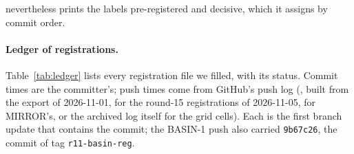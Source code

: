 nevertheless prints the labels pre-registered and decisive, which it assigns by commit order.

\paragraph{Ledger of registrations.} Table~\ref{tab:ledger} lists every registration file we filled, with its status. Commit times are the committer's; push times come from GitHub's push log (, built from the export of 2026-11-01,  for the round-15 registrations of 2026-11-05,  for MIRROR's, or the archived log itself for the grid cells). Each is the first branch update that contains the commit; the BASIN-1 push also carried \texttt{9b67c26}, the commit of tag \texttt{r11-basin-reg}.


